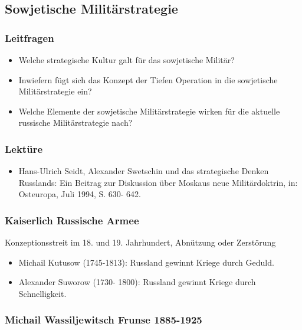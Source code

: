 {}\documentclass[a4paper]{article}
\providecommand{\tightlist}{\setlength{\itemsep}{1mm}\setlength{\parskip}{1mm}}
\begin{document}
\subsection{Sowjetische
	Militärstrategie}\label{sowjetische-milituxe4rstrategie}

\subsubsection{Leitfragen}\label{leitfragen-2}

\begin{itemize}
	\tightlist
	\item
	      Welche strategische Kultur galt für das sowjetische Militär?
	\item
	      Inwiefern fügt sich das Konzept der Tiefen Operation in die
	      sowjetische Militärstrategie ein?
	\item
	      Welche Elemente der sowjetische Militärstrategie wirken für die
	      aktuelle russische Militärstrategie nach?
\end{itemize}

\subsubsection{Lektüre}\label{lektuxfcre-2}

\begin{itemize}
	\tightlist
	\item
	      Hans-Ulrich Seidt, Alexander Swetschin und das strategische Denken
	      Russlands: Ein Beitrag zur Diskussion über Moskaus neue
	      Militärdoktrin, in: Osteuropa, Juli 1994, S. 630- 642.
\end{itemize}

\subsubsection{Kaiserlich Russische
	Armee}\label{kaiserlich-russische-armee}

Konzeptionsstreit im 18. und 19. Jahrhundert, Abnützung oder Zerstörung

\begin{itemize}
	\tightlist
	\item
	      Michail Kutusow (1745-1813): Russland gewinnt Kriege durch Geduld.
	\item
	      Alexander Suworow (1730- 1800): Russland gewinnt Kriege durch
	      Schnelligkeit.
\end{itemize}

\subsubsection{Michail Wassiljewitsch Frunse
	1885-1925}\label{michail-wassiljewitsch-frunse-1885-1925}
\end{document}
